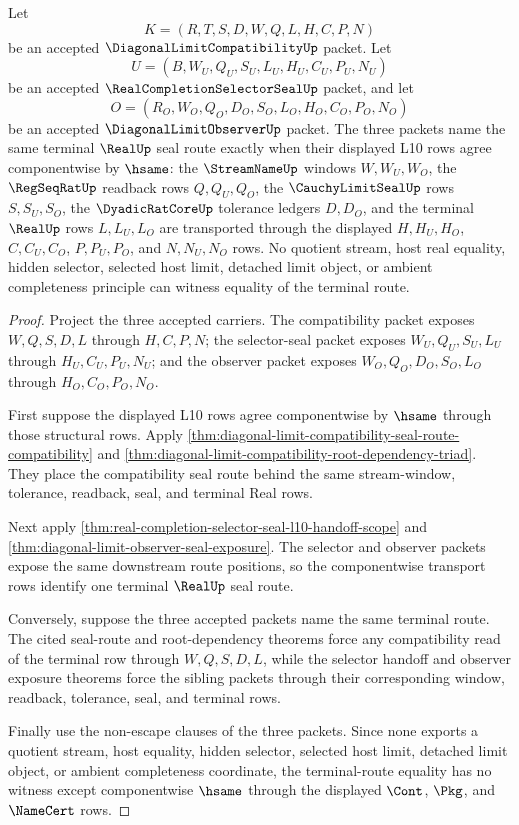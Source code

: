 \begin{theorem}
\label{thm:diagonal-limit-compatibility-selector-observer-seal-correspondence}
Let
$$
K=(R,T,S,D,W,Q,L,H,C,P,N)
$$
be an accepted $\DiagonalLimitCompatibilityUp$ packet. Let
$$
U=(B,W_U,Q_U,S_U,L_U,H_U,C_U,P_U,N_U)
$$
be an accepted $\RealCompletionSelectorSealUp$ packet, and let
$$
O=(R_O,W_O,Q_O,D_O,S_O,L_O,H_O,C_O,P_O,N_O)
$$
be an accepted $\DiagonalLimitObserverUp$ packet. The three packets name the
same terminal $\RealUp$ seal route exactly when their displayed L10 rows agree
componentwise by $\hsame$: the $\StreamNameUp$ windows $W,W_U,W_O$, the
$\RegSeqRatUp$ readback rows $Q,Q_U,Q_O$, the $\CauchyLimitSealUp$ rows
$S,S_U,S_O$, the $\DyadicRatCoreUp$ tolerance ledgers $D,D_O$, and the terminal
$\RealUp$ rows $L,L_U,L_O$ are transported through the displayed $H,H_U,H_O$,
$C,C_U,C_O$, $P,P_U,P_O$, and $N,N_U,N_O$ rows. No quotient stream, host real
equality, hidden selector, selected host limit, detached limit object, or
ambient completeness principle can witness equality of the terminal route.
\end{theorem}
\begin{proof}
Project the three accepted carriers. The compatibility packet exposes
$W,Q,S,D,L$ through $H,C,P,N$; the selector-seal packet exposes
$W_U,Q_U,S_U,L_U$ through $H_U,C_U,P_U,N_U$; and the observer packet exposes
$W_O,Q_O,D_O,S_O,L_O$ through $H_O,C_O,P_O,N_O$.

First suppose the displayed L10 rows agree componentwise by $\hsame$ through
those structural rows. Apply
\autoref{thm:diagonal-limit-compatibility-seal-route-compatibility} and
\autoref{thm:diagonal-limit-compatibility-root-dependency-triad}. They place
the compatibility seal route behind the same stream-window, tolerance,
readback, seal, and terminal Real rows.

Next apply
\autoref{thm:real-completion-selector-seal-l10-handoff-scope} and
\autoref{thm:diagonal-limit-observer-seal-exposure}. The selector and observer
packets expose the same downstream route positions, so the componentwise
transport rows identify one terminal $\RealUp$ seal route.

Conversely, suppose the three accepted packets name the same terminal route.
The cited seal-route and root-dependency theorems force any compatibility read
of the terminal row through $W,Q,S,D,L$, while the selector handoff and observer
exposure theorems force the sibling packets through their corresponding
window, readback, tolerance, seal, and terminal rows.

Finally use the non-escape clauses of the three packets. Since none exports a
quotient stream, host equality, hidden selector, selected host limit, detached
limit object, or ambient completeness coordinate, the terminal-route equality
has no witness except componentwise $\hsame$ through the displayed $\Cont$,
$\Pkg$, and $\NameCert$ rows.
\end{proof}

